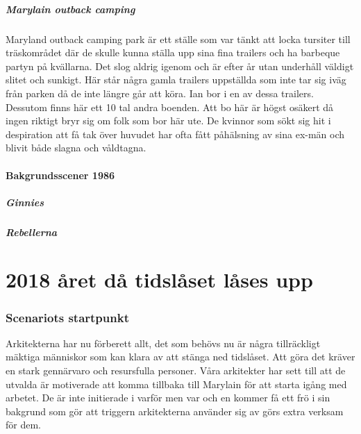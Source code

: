 \subsubsection{Marylain outback camping}
Maryland outback camping park är ett ställe som var tänkt att locka tursiter till träskområdet där de skulle kunna ställa upp sina fina trailers och ha barbeque partyn på kvällarna. Det slog aldrig igenom och är efter år utan underhåll väldigt slitet och sunkigt. Här står några gamla trailers uppställda som inte tar sig iväg från parken då de inte längre går att köra. Ian bor i en av dessa trailers. Dessutom finns här ett 10 tal andra boenden. Att bo här är högst osäkert då ingen riktigt bryr sig om folk som bor här ute. De kvinnor som sökt sig hit i despiration att få tak över huvudet har ofta fått påhälsning av sina ex-män och blivit både slagna och våldtagna.
\subsection{Bakgrundsscener 1986}
\subsubsection{Ginnies}
\subsubsection{Rebellerna}
\clearpage
\part{2018 året då tidslåset låses upp}
\section{Scenariots startpunkt}
Arkitekterna har nu förberett allt, det som behövs nu är några tillräckligt mäktiga människor som kan klara av att stänga ned tidslåset. Att göra det kräver en stark gennärvaro och resursfulla personer. Våra arkitekter har sett till att de utvalda är motiverade att komma tillbaka till Marylain för att starta igång med arbetet. De är inte initierade i varför men var och en kommer få ett frö i sin bakgrund som gör att triggern arkitekterna använder sig av görs extra verksam för dem.
